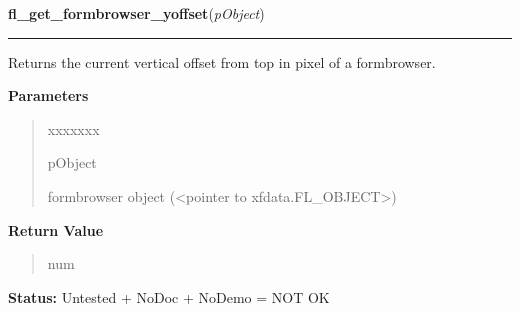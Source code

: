 \hspace{.8\funcindent}\begin{boxedminipage}{\funcwidth}

    \raggedright \textbf{fl\_get\_formbrowser\_yoffset}(\textit{pObject})

    \vspace{-1.5ex}

    \rule{\textwidth}{0.5\fboxrule}
\setlength{\parskip}{2ex}
    Returns the current vertical offset from top in pixel of a formbrowser.

\setlength{\parskip}{1ex}
      \textbf{Parameters}
      \vspace{-1ex}

      \begin{quote}
        \begin{Ventry}{xxxxxxx}

          \item[pObject]

          formbrowser object ({\textless}pointer to 
          xfdata.FL\_OBJECT{\textgreater})

        \end{Ventry}

      \end{quote}

      \textbf{Return Value}
    \vspace{-1ex}

      \begin{quote}
      num

      \end{quote}

\textbf{Status:} Untested + NoDoc + NoDemo = NOT OK



    \end{boxedminipage}

    \label{xformslib:library:fl_find_formbrowser_form_number}

    \vspace{0.5ex}

